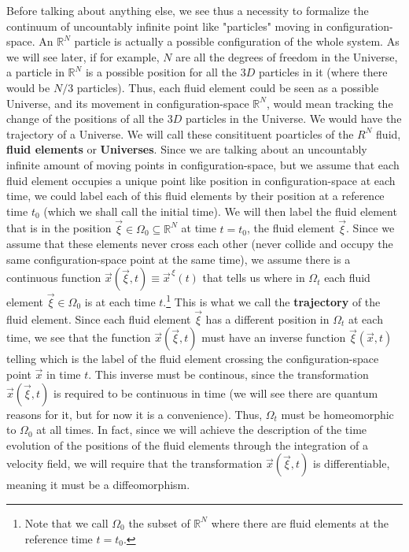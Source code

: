 \documentclass[11pt, a4paper]{article} %
\newcommand{\R}{\mathbb{R}} %
\begin{document}
Before talking about anything else, we see thus a necessity to formalize the continuum of uncountably infinite point like "particles" moving in configuration-space. An $\R^N$ particle is actually a possible configuration of the whole system. As we will see later, if for example, $N$ are all the degrees of freedom in the Universe, a particle in $\R^N$ is a possible position for all the $3D$ particles in it (where there would be $N/3$ particles). Thus, each fluid element could be seen as a possible Universe, and its movement in configuration-space $\R^N$, would mean tracking the change of the positions of all the $3D$ particles in the Universe. We would have the trajectory of a Universe. We will call these consitituent poarticles of the $R^N$ fluid, {\bf fluid elements} or {\bf Universes}. Since we are talking about an uncountably infinite amount of moving points in configuration-space, but we assume that each fluid element occupies a unique point like position in configuration-space at each time, we could label each of this fluid elements by their position at a reference time $t_0$ (which we shall call the initial time). We will then label the fluid element that is in the position $\vec{\xi}\in\Omega_0\subseteq \R^N$ at time $t=t_0$, the fluid element $\vec{\xi}$. Since we assume that these elements never cross each other (never collide and occupy the same configuration-space point at the same time), we assume there is a continuous function $\vec{x}(\vec{\xi},t)\equiv \vec{x}^{\, \xi}(t)$ that tells us where in $\Omega_t$ each fluid element $\vec{\xi}\in\Omega_0$ is at each time $t$.\footnote{Note that we call $\Omega_0$ the subset of $\R^N$ where there are fluid elements at the reference time $t=t_0$. } This is what we call the {\bf trajectory} of the fluid element. Since each fluid element $\vec{\xi}$ has a different position in $\Omega_t$ at each time, we see that the function $\vec{x}(\vec{\xi},t)$ must have an inverse function $\vec{\xi}(\vec{x},t)$ telling which is the label of the fluid element crossing the configuration-space point $\vec{x}$ in time $t$. This inverse must be continous, since the transformation $\vec{x}(\vec{\xi},t)$ is required to be continuous in time (we will see there are quantum reasons for it, but for now it is a convenience). Thus, $\Omega_t$ must be homeomorphic to $\Omega_0$ at all times. In fact, since we will achieve the description of the time evolution of the positions of the fluid elements through the integration of a velocity field, we will require that the transformation $\vec{x}(\vec{\xi},t)$ is differentiable, meaning it must be a diffeomorphism.
\end{document}
